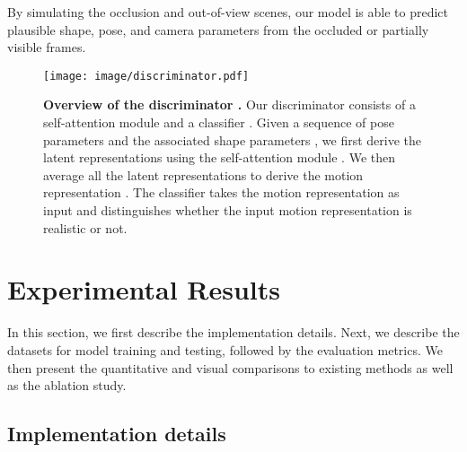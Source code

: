 \documentclass[times,referee,twocolumn,final,authoryear]{elsarticle}
\begin{document}
By simulating the occlusion and out-of-view scenes, our model is able to predict plausible shape, pose, and camera parameters from the occluded or partially visible frames.

\begin{figure}[t]
  \begin{center}
    \texttt{[image: image/discriminator.pdf]}
  \end{center}
  \vspace{-5.0mm}
  \caption{
\textbf{Overview of the discriminator .}
Our discriminator  consists of a self-attention module  and a classifier .
Given a sequence of pose parameters  and the associated shape parameters , we first derive the latent representations  using the self-attention module .
We then average all the latent representations  to derive the motion representation .
The classifier  takes the motion representation  as input and distinguishes whether the input motion representation  is realistic or not.
  }
  \label{fig:discriminator}
  \vspace{-5.0mm} 
\end{figure}

\vspace{-3.0mm}  
\section{Experimental Results}

In this section, we first describe the implementation details.
Next, we describe the datasets for model training and testing, followed by the evaluation metrics.
We then present the quantitative and visual comparisons to existing methods as well as the ablation study.

\vspace{-2.0mm} 
\subsection{Implementation details} 
\end{document}
